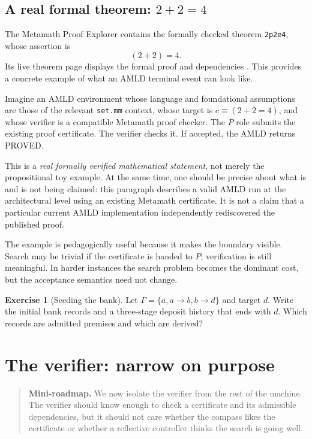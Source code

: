\documentclass[11pt,openany]{book}
\theoremstyle{definition}
\newtheorem{exercise}[theorem]{Exercise}
\theoremstyle{remark}
\newenvironment{miniroadmap}{\begin{quote}\small\color{deepblue}\textbf{Mini-roadmap.} }{\end{quote}}
\begin{document}
\section{A real formal theorem: \texorpdfstring{$2+2=4$}{2+2=4}}
The Metamath Proof Explorer contains the formally checked theorem \texttt{2p2e4}, whose assertion is
\[
(2+2)=4.
\]
Its live theorem page displays the formal proof and dependencies \cite{Metamath2p2e4}. This provides a concrete example of what an AMLD terminal event can look like.

Imagine an AMLD environment whose language and foundational assumptions are those of the relevant \texttt{set.mm} context, whose target is $c\equiv(2+2=4)$, and whose verifier is a compatible Metamath proof checker. The $P$ role submits the existing proof certificate. The verifier checks it. If accepted, the AMLD returns \textsf{PROVED}.

This is a \emph{real formally verified mathematical statement}, not merely the propositional toy example. At the same time, one should be precise about what is and is not being claimed: this paragraph describes a valid AMLD run at the architectural level using an existing Metamath certificate. It is not a claim that a particular current AMLD implementation independently rediscovered the published proof.

The example is pedagogically useful because it makes the boundary visible. Search may be trivial if the certificate is handed to $P$; verification is still meaningful. In harder instances the search problem becomes the dominant cost, but the acceptance semantics need not change.

\begin{exercise}[Seeding the bank]\label{ex:seed}
Let $\Gamma=\{a, a\to b, b\to d\}$ and target $d$. Write the initial bank records and a three-stage deposit history that ends with $d$. Which records are admitted premises and which are derived?
\end{exercise}

\chapter{The verifier: narrow on purpose}
\begin{miniroadmap}
We now isolate the verifier from the rest of the machine. The verifier should know enough to check a certificate and its admissible dependencies, but it should not care whether the compass likes the certificate or whether a reflective controller thinks the search is going well.
\end{miniroadmap}
\end{document}
